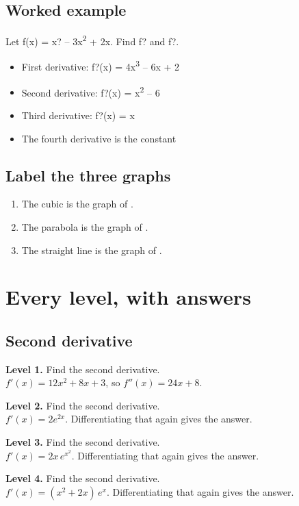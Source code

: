 \documentclass[11pt]{article}
\begin{document}
\subsection*{Worked example}
Let f(x) = x? -- 3x\textsuperscript{2} + 2x. Find f? and f?.\\
\begin{itemize}
\item First derivative: f?(x) = 4x\textsuperscript{3} -- 6x + 2
\item Second derivative: f?(x) = x\textsuperscript{2} -- 6
\item Third derivative: f?(x) = x
\item The fourth derivative is the constant 
\end{itemize}
\subsection*{Label the three graphs}
\begin{enumerate}
\item The cubic is the graph of .
\item The parabola is the graph of .
\item The straight line is the graph of .
\end{enumerate}
\section*{Every level, with answers}
\subsection*{Second derivative}
\noindent\textbf{Level 1.} Find the second derivative.\\  \quad $f'(x)=12x^{2}+8x+3$, so $f''(x)=24x+8$.\par\medskip
\noindent\textbf{Level 2.} Find the second derivative.\\  \quad $f'(x)=2e^{2x}$. Differentiating that again gives the answer.\par\medskip
\noindent\textbf{Level 3.} Find the second derivative.\\  \quad $f'(x)=2x\,e^{x^{2}}$. Differentiating that again gives the answer.\par\medskip
\noindent\textbf{Level 4.} Find the second derivative.\\  \quad $f'(x)=(x^{2}+2x)\,e^{x}$. Differentiating that again gives the answer.\par\medskip
\end{document}
